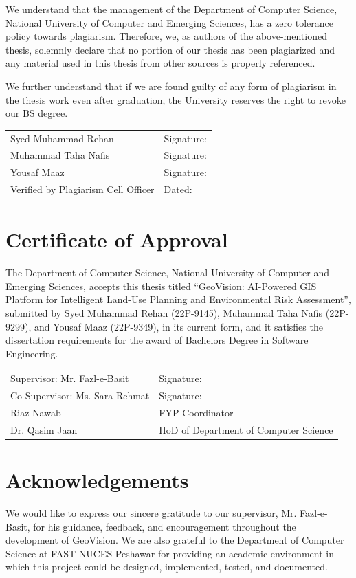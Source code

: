 \documentclass[12pt,a4paper,oneside]{report}
\begin{document}
We understand that the management of the Department of Computer Science, National University of Computer and Emerging Sciences, has a zero tolerance policy towards plagiarism. Therefore, we, as authors of the above-mentioned thesis, solemnly declare that no portion of our thesis has been plagiarized and any material used in this thesis from other sources is properly referenced.

We further understand that if we are found guilty of any form of plagiarism in the thesis work even after graduation, the University reserves the right to revoke our BS degree.

\vspace{1cm}
\begin{tabular}{p{}p{}}
Syed Muhammad Rehan & Signature: \\[0.6cm]
Muhammad Taha Nafis & Signature: \\[0.6cm]
Yousaf Maaz & Signature: \\[0.8cm]
Verified by Plagiarism Cell Officer & Dated:
\end{tabular}

\chapter*{Certificate of Approval}
The Department of Computer Science, National University of Computer and Emerging Sciences, accepts this thesis titled ``GeoVision: AI-Powered GIS Platform for Intelligent Land-Use Planning and Environmental Risk Assessment'', submitted by Syed Muhammad Rehan (22P-9145), Muhammad Taha Nafis (22P-9299), and Yousaf Maaz (22P-9349), in its current form, and it satisfies the dissertation requirements for the award of Bachelors Degree in Software Engineering.

\vspace{0.8cm}
\begin{tabular}{p{}p{}}
Supervisor: Mr. Fazl-e-Basit & Signature: \\[0.7cm]
Co-Supervisor: Ms. Sara Rehmat & Signature: \\[0.7cm]
Riaz Nawab & FYP Coordinator \\[0.7cm]
Dr. Qasim Jaan & HoD of Department of Computer Science
\end{tabular}

\chapter*{Acknowledgements}
We would like to express our sincere gratitude to our supervisor, Mr. Fazl-e-Basit, for his guidance, feedback, and encouragement throughout the development of GeoVision. We are also grateful to the Department of Computer Science at FAST-NUCES Peshawar for providing an academic environment in which this project could be designed, implemented, tested, and documented.
\end{document}
